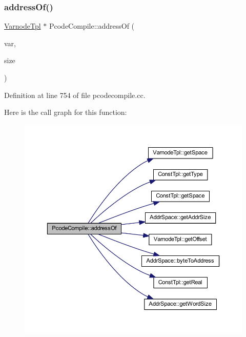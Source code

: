\subsubsection{\texorpdfstring{addressOf()}{addressOf()}}
{\footnotesize\ttfamily \mbox{\hyperlink{class_varnode_tpl}{Varnode\+Tpl}} $\ast$ Pcode\+Compile\+::address\+Of (\begin{DoxyParamCaption}\item[{\mbox{\hyperlink{class_varnode_tpl}{Varnode\+Tpl}} $\ast$}]{var,  }\item[{uint4}]{size }\end{DoxyParamCaption})}



Definition at line 754 of file pcodecompile.\+cc.

Here is the call graph for this function\+:
\nopagebreak
\begin{figure}[H]
\begin{center}
\leavevmode
\includegraphics[width=350pt]{class_pcode_compile_a31003fa38370385ed889845d9616ba15_cgraph}
\end{center}
\end{figure}
\mbox{\label{class_pcode_compile_a2f916c4254dca29203c7cb530d35cae8}} 
